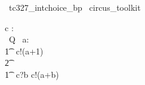 
\begin{zsection}
  \SECTION\ tc327\_intchoice\_bp \parents\ circus\_toolkit
\end{zsection}

\begin{circus}
    \circchannel c : \nat \\
    \circprocess\ Q \circdef\  a: \nat \circspot \\
    	\t1 \circbegin \circspot\ c!(a+1) \then \Skip \circend \\
		\t2 \intchoice \\
	\t1 \circbegin \circspot\ c?b  \then c!(a+b) \then \Skip \circend 
\end{circus}
